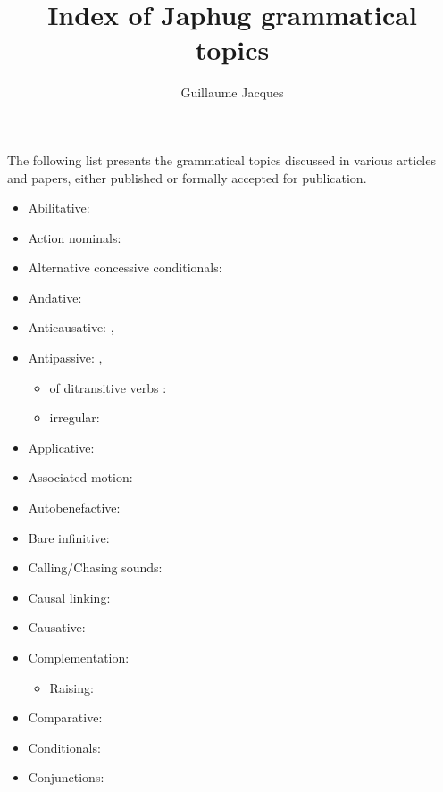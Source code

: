 \documentclass[oldfontcommands,oneside,a4paper,11pt]{article}
\begin{document}
 
\title{Index of Japhug grammatical topics}
\author{Guillaume Jacques}
\maketitle

The following list presents the grammatical topics discussed in various articles and papers, either published or formally accepted for publication.

\begin{itemize}
\item Abilitative: \citet{jacques15causative}
\item Action nominals: \citet[7]{jacques14antipassive}
\item Alternative concessive conditionals: \citet[298]{jacques14linking}
\item Andative: \citet[200-6]{jacques13harmonization}
\item Anticausative: \citet[213-4]{jacques12demotion}, \citet{jacques15spontaneous}
\item Antipassive: \citet[215-6]{jacques12demotion}, \citet{jacques14antipassive}
\begin{itemize}
\item of ditransitive verbs : \citet[13-4]{jacques14antipassive}
\item irregular:  \citet[18-20]{jacques14antipassive}
\end{itemize}
\item Applicative: \citet{jacques13tropative}
\item Associated motion: \citet[200-6]{jacques13harmonization}
\item Autobenefactive: \citet{jacques15spontaneous}
\item Bare infinitive: \citet[9]{jacques14antipassive}
\item Calling/Chasing sounds:   \citet[283-4]{japhug14ideophones}
\item Causal linking:  \citet[303-6]{jacques14linking}
\item Causative: \citet{jacques15causative}
\item Complementation: \citet{jacques16sketch}
\begin{itemize}
\item  Raising: \citet{jacques15causative}
\end{itemize}
\item Comparative: \citet{jacques15comparative}
\item Conditionals:  \citet[296-300]{jacques14linking}
\item Conjunctions:  \citet[276-7]{jacques14linking}

\end{itemize}
\end{document}
